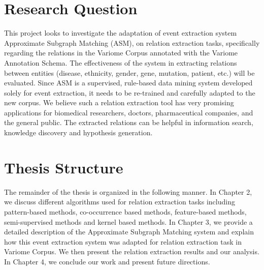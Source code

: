 \section{Research Question}\label{section1.3} %
This project looks to investigate the adaptation of event extraction system Approximate Subgraph Matching (ASM)\cite{liu2013approximate},  on relation extraction tasks, specifically regarding the relations in the Variome Corpus annotated with the Variome Annotation Schema\cite{verspoor2013annotating}. The effectiveness of the system in extracting relations between entities (disease, ethnicity, gender, gene, mutation, patient, etc.) will be evaluated. Since ASM is a supervised, rule-based data mining system developed solely for event extraction, it needs to be re-trained and carefully adapted to the new corpus. We believe such a relation extraction tool has very promising applications for biomedical researchers, doctors, pharmaceutical companies, and the general public. The extracted relations can be helpful in information search, knowledge discovery and hypothesis generation. 
\section{Thesis Structure}
The remainder of the thesis is organized in the following manner. In Chapter 2, we discuss different algorithms used for relation extraction tasks including pattern-based methods, co-occurrence based methods, feature-based methods, semi-supervised methods and kernel based methods. In Chapter 3, we provide a detailed description of the Approximate Subgraph Matching system and explain how this event extraction system was adapted for relation extraction task in Variome Corpus. We then present the relation extraction results and our analysis. In Chapter 4, we conclude our work and present future directions.

